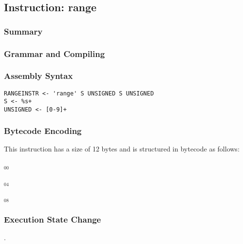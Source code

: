 \subsection{Instruction: range}

\subsubsection{Summary}


\subsubsection{Grammar and Compiling}


\subsubsection{Assembly Syntax}

\begin{myquote}
\begin{verbatim}
RANGEINSTR <- 'range' S UNSIGNED S UNSIGNED
S <- %s+
UNSIGNED <- [0-9]+
\end{verbatim}
\end{myquote}


\subsubsection{Bytecode Encoding}

This instruction has a size of 12 bytes and is structured in bytecode as follows:

$_{00}$\ 



$_{04}$\ 



$_{08}$\ 
\fbox{%
  \parbox{20pt}{%
00
  }%
}


\subsubsection{Execution State Change}

.


